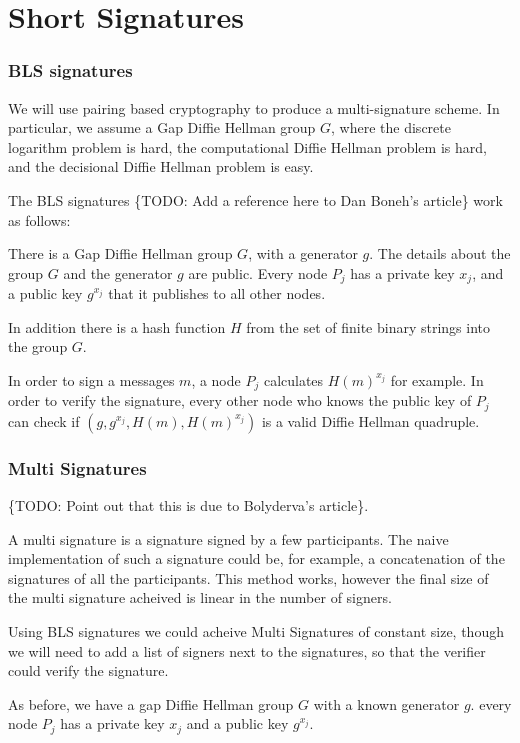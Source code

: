 \part{Short Signatures}

\section{BLS signatures}
We will use pairing based cryptography to produce a multi-signature scheme. In
particular, we assume a Gap Diffie Hellman group $G$, where the discrete
logarithm problem is hard, the computational Diffie Hellman problem is hard, and
the decisional Diffie Hellman problem is easy. 

The BLS signatures \{TODO: Add a reference here to Dan Boneh's article\} work as
follows:

There is a Gap Diffie Hellman group $G$, with a generator $g$. The details about
the group $G$ and the generator $g$ are public. Every node $P_j$ has a private
key $x_j$, and a public key $g^{x_j}$ that it publishes to all other nodes.

In addition there is a hash function $H$ from the set of finite binary strings
into the group $G$. 

In order to sign a messages $m$, a node $P_j$ calculates ${H(m)}^{x_j}$ for
example. In order to verify the signature, every other node who knows the public
key of $P_j$ can check if $(g,g^{x_j},H(m),{H(m)}^{x_j})$ is a valid Diffie
Hellman quadruple.

\section{Multi Signatures}
\{TODO: Point out that this is due to Bolyderva's article\}.

A multi signature is a signature signed by a few participants. The naive
implementation of such a signature could be, for example, a concatenation of the
signatures of all the participants. This method works, however the final size of
the multi signature acheived is linear in the number of signers.

Using BLS signatures we could acheive Multi Signatures of constant size, though
we will need to add a list of signers next to the signatures, so that the
verifier could verify the signature.

As before, we have a gap Diffie Hellman group $G$ with a known generator $g$.
every node $P_j$ has a private key $x_j$ and a public key $g^{x_j}$.

